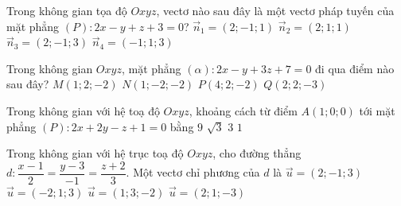 \begin{ex}%
Trong không gian tọa độ $Oxyz$, vectơ nào sau đây là một vectơ pháp tuyến của mặt phẳng $(P)\colon 2x - y + z + 3 = 0$?
\choice
{\True $\overrightarrow{n}_1=(2;-1;1)$}
{$\overrightarrow{n}_2=(2;1;1)$}
{$\overrightarrow{n}_3=(2;-1;3)$}
{$\overrightarrow{n}_4=(-1;1;3)$}
\end{ex}

\begin{ex}%
 	Trong không gian $Oxyz$, mặt phẳng $(\alpha) \colon 2x-y+3z+7=0$ đi qua điểm nào sau đây?
 	\choice
 	{$M(1;2;-2)$}
 	{$N(1;-2;-2)$}
 	{$P(4;2;-2)$}
 	{\True $Q(2;2;-3)$}
 \end{ex}

\begin{ex}%
	Trong không gian với hệ toạ độ $Oxyz$, khoảng cách từ điểm $A(1;0;0)$ tới mặt phẳng $(P) \colon 2x+2y-z+1=0$ bằng
	\choice
	{$9$}
	{$\sqrt{3}$}
	{$3$}
	{\True $1$}
\end{ex}

\begin{ex}%
	Trong không gian với hệ trục toạ độ $Oxyz$, cho đường thẳng $d\colon \dfrac{x-1}{2} = \dfrac{y-3}{-1} = \dfrac{z+2}{3}$. Một vectơ chỉ phương của $d$ là
	\choice
	{\True $\overrightarrow{u}=(2;-1;3)$}
	{$\overrightarrow{u}=(-2;1;3)$}
	{$\overrightarrow{u}=(1;3;-2)$}
	{$\overrightarrow{u}=(2;1;-3)$}
\end{ex}

